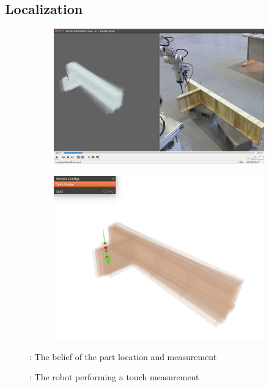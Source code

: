\documentclass[../thesis.tex]{subfiles}
\begin{document}
\subsection{Localization}

\begin{figure}
\centering
    \begin{subfigure}[b]{.49\linewidth}
      \includegraphics[width=\linewidth, clip, trim=9in 3in 0in 1in]{./Introduction/Overview2}
        \caption{}
        \label{fig:Rigid:Overview_1}
    \end{subfigure}
    \hfill
    \begin{subfigure}[b]{.49\linewidth}
      \includegraphics[width=\linewidth, clip, trim=1.5in 1.5in 1.5in 1.3in]{./Introduction/Particle_Intersection}
        \caption{}
        \label{fig:Rigid:Overview_2}
    \end{subfigure}
\caption{: The robot performing a touch measurement}
: The belief of the part location and measurement
\label{fig:Rigid:Overview}
\end{figure}
\end{document}
